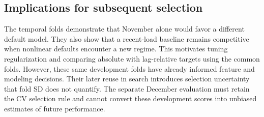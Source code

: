 \subsection{Implications for subsequent selection}
The temporal folds demonstrate that November alone would favor a different default model. They also show that a recent-load baseline remains competitive when nonlinear defaults encounter a new regime. This motivates tuning regularization and comparing absolute with lag-relative targets using the common folds. However, these same development folds have already informed feature and modeling decisions. Their later reuse in search introduces selection uncertainty that fold SD does not quantify. The separate December evaluation must retain the CV selection rule and cannot convert these development scores into unbiased estimates of future performance.
